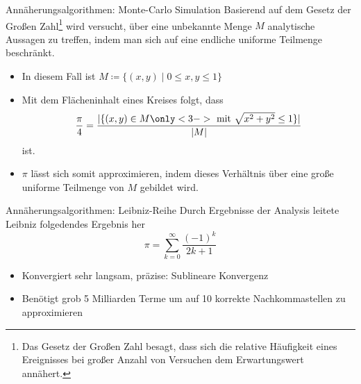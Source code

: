 \documentclass{beamer}
\begin{document}
\begin{frame}{Annäherungsalgorithmen: Monte-Carlo Simulation}
    Basierend auf dem Gesetz der Großen Zahl\footnote{Das Gesetz der Großen Zahl
        besagt, dass sich die relative Häufigkeit eines Ereignisses bei großer Anzahl
        von Versuchen dem Erwartungswert annähert.
    } wird versucht, über eine unbekannte Menge \(M\) analytische Aussagen zu treffen,
    indem man sich auf eine endliche uniforme Teilmenge beschränkt.
    \begin{itemize}
        \item<1-> In diesem Fall ist \(M \coloneq \{(x, y) \mid 0 \le x,y \le 1\}\)
        \item<2-> Mit dem Flächeninhalt eines Kreises folgt, dass
              \begin{equation*}
                  \frac{\pi}{4} = \frac{
                      |\{(x,y) \in M \only<3->{\text{\ mit } \sqrt{x^2 + y^2} \le 1} \}|
                  }{|M|}
              \end{equation*}
              ist.
        \item<4-> \(\pi\) lässt sich somit approximieren, indem dieses Verhältnis über eine große uniforme Teilmenge von \(M\) gebildet wird.
    \end{itemize}
\end{frame}


\begin{frame}{Annäherungsalgorithmen: Leibniz-Reihe}
    Durch Ergebnisse der Analysis leitete Leibniz folgedendes Ergebnis her \cite{Leibniz}                                                                                                       
    \[ \pi = \sum_{k=0}^{\infty} \frac{(-1)^k}{2k+1} \] 
    \begin{itemize}
        \item<3-> Konvergiert sehr langsam, präzise: Sublineare Konvergenz \\
        \item<3-> Benötigt grob 5 Milliarden Terme um auf 10 korrekte Nachkommastellen zu approximieren
    \end{itemize}
\end{frame}
\end{document}
